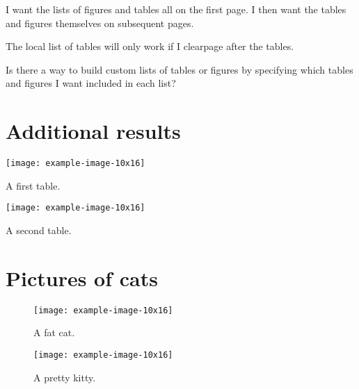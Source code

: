 \documentclass{article}
\begin{document}
I want the lists of figures and tables all on the first page. I then want the tables and figures themselves on subsequent pages.

The local list of tables will only work if I clearpage after the tables.

Is there a way to build custom lists of tables or figures by specifying which tables and figures I want included in each list?

\section{Additional results}

\locallistoftables

\begin{table}[p]
\centering\texttt{[image: example-image-10x16]}
\caption[Results I]{A first table.}
\end{table}

\begin{table}[p]
\centering\texttt{[image: example-image-10x16]}
\caption[Results II]{A second table.}
\end{table}


\section{Pictures of cats}

\locallistoffigures

\begin{figure}[p]
\centering\texttt{[image: example-image-10x16]}
\caption[Cat]{A fat cat.}
\end{figure}

\begin{figure}[p]
\centering\texttt{[image: example-image-10x16]}
\caption[Kitty]{A pretty kitty.}
\end{figure}
\end{document}
